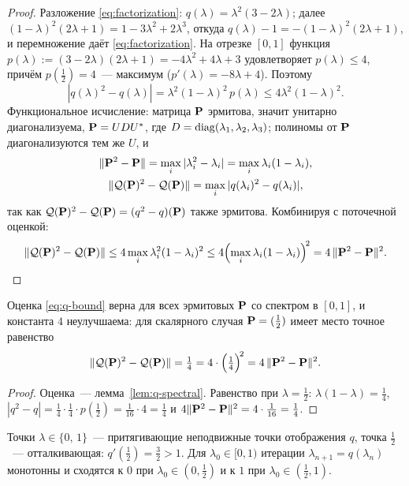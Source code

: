 \begin{proof}
Разложение \eqref{eq:factorization}: $q(\lambda) = \lambda^2(3-2\lambda)$;
далее $(1-\lambda)^2(2\lambda+1) = 1 - 3\lambda^2 + 2\lambda^3$, откуда
$q(\lambda) - 1 = -(1-\lambda)^2(2\lambda+1)$, и перемножение даёт
\eqref{eq:factorization}. На отрезке $[0,1]$ функция
$p(\lambda) := (3-2\lambda)(2\lambda+1) = -4\lambda^2+4\lambda+3$
удовлетворяет $p(\lambda) \le 4$, причём $p(\tfrac12) = 4$~--- максимум
($p'(\lambda) = -8\lambda+4$). Поэтому
\[
  |q(\lambda)^2 - q(\lambda)| = \lambda^2(1-\lambda)^2\,p(\lambda)
  \le 4\lambda^2(1-\lambda)^2 .
\]
Функциональное исчисление: матрица $\mathbf{P}$ эрмитова, значит унитарно
диагонализуема, $\mathbf{P} = U D U^{*}$, где $D = \operatorname{diag}(\lambda_1,\lambda_2,\lambda_3)$;
полиномы от $\mathbf{P}$ диагонализуются тем же $U$, и
\begin{gather*}
  \|\mathbf{P}^2-\mathbf{P}\| = \max_i|\lambda_i^2-\lambda_i| = \max_i \lambda_i(1-\lambda_i),\\
  \|\mathcal Q(\mathbf{P})^2-\mathcal Q(\mathbf{P})\|
  = \max_i |q(\lambda_i)^2-q(\lambda_i)| ,
\end{gather*}
так как $\mathcal Q(\mathbf{P})^2-\mathcal Q(\mathbf{P}) = (q^2-q)(\mathbf{P})$ также
эрмитова. Комбинируя с поточечной оценкой:
\[
  \|\mathcal Q(\mathbf{P})^2-\mathcal Q(\mathbf{P})\|
  \le 4\max_i \lambda_i^2(1-\lambda_i)^2
  \le 4\Bigl(\max_i \lambda_i(1-\lambda_i)\Bigr)^{\!2}
  = 4\,\|\mathbf{P}^2-\mathbf{P}\|^2 . \qedhere
\]
\end{proof}

\begin{theorem}\label{th:mcweeny}
Оценка \eqref{eq:q-bound} верна для всех эрмитовых $\mathbf{P}$ со спектром
в $[0,1]$, и константа $4$ неулучшаема: для скалярного случая
$\mathbf{P} = (\tfrac12)$ имеет место точное равенство
\[
  \|\mathcal Q(\mathbf{P})^2-\mathcal Q(\mathbf{P})\| = \tfrac14 = 4\cdot\Bigl(\tfrac14\Bigr)^{\!2} = 4\,\|\mathbf{P}^2-\mathbf{P}\|^2 .
\]
\end{theorem}

\begin{proof}
Оценка~--- лемма~\ref{lem:q-spectral}. Равенство при $\lambda=\tfrac12$:
$\lambda(1-\lambda) = \tfrac14$,
$|q^2-q| = \tfrac14\cdot\tfrac14\cdot p(\tfrac12) = \tfrac1{16}\cdot4 = \tfrac14$
и $4\|\mathbf{P}^2-\mathbf{P}\|^2 = 4\cdot\tfrac1{16} = \tfrac14$.
\end{proof}

\begin{proposition}\label{prop:mcweeny-iter}
Точки $\lambda \in \{0,\,1\}$~--- притягивающие неподвижные точки
отображения $q$, точка $\tfrac12$~--- отталкивающая:
$q'(\tfrac12) = \tfrac32 > 1$. Для $\lambda_0 \in [0,1)$ итерации
$\lambda_{n+1} = q(\lambda_n)$ монотонны и сходятся к $0$ при
$\lambda_0 \in (0,\tfrac12)$ и к $1$ при $\lambda_0 \in (\tfrac12,1)$.
\end{proposition}

